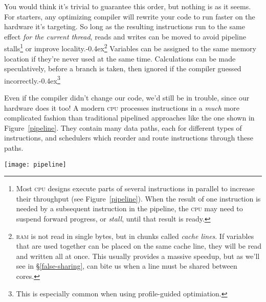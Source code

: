 \documentclass[fontsize=\bodyfontsize, numbers=endperiod]{scrartcl}
\newcommand{\punckern}{\kern-0.4ex}
\newcommand{\cpp}[1]{C\kern-0.1ex\raisebox{0.15ex}{\texttt{++}}{\addfontfeature{Numbers=LowercaseOff}#1}}
\newcommand{\fig}[1]{Figure~\ref{#1}}
\newcommand{\introduce}[1]{\textit{#1}}
\newcommand{\secref}[1]{\hyperref[#1]{\textsc{\S}\ref*{#1}}}
\newenvironment{colfigure}
  {\par\vspace{1\baselineskip minus 0.5\baselineskip}\noindent\minipage{\linewidth}}
  {\endminipage\vspace{1\baselineskip minus 0.7\baselineskip}}
\begin{document}
\begin{multicols}{2}
You would think it's trivial to guarantee this order,
but nothing is as it seems.
For starters, any optimizing compiler will
rewrite your code to run faster on the hardware
it's targeting.
So long as the resulting instructions run to the same effect
\emph{for the current thread},
reads and writes can be moved to avoid pipeline stalls\footnote{%
Most \textsc{cpu} designs execute parts of several instructions in parallel
to increase their throughput (see \fig{pipeline}).
When the result of one instruction is needed by
a subsequent instruction in the pipeline, the \textsc{cpu} may need
to suspend forward progress, or \introduce{stall}, until that result is ready.}
or improve locality.\punckern\footnote{%
\textsc{ram} is not read in single bytes, but in chunks called
\introduce{cache lines}.
If variables that are used together can be placed on the same cache line,
they will be read and written all at once.
This usually provides a massive speedup,
but as we'll see in \secref{false-sharing},
can bite us when a line must be shared between cores.
}
Variables can be assigned to the same memory location if they're never used
at the same time.
Calculations can be made speculatively, before a branch is taken,
then ignored if the compiler guessed incorrectly.\punckern\footnote{This is
especially common when using profile-guided optimiation.}

Even if the compiler didn't change our code,
we'd still be in trouble, since our hardware does it too!
A modern \textsc{cpu} processes instructions in
a \emph{much} more complicated fashion than traditional pipelined approaches
like the one shown in \fig{pipeline}.
They contain many data paths, each for different types of instructions,
and schedulers which reorder and route instructions through these paths.
\begin{colfigure}
\centering
\texttt{[image: pipeline]}
\label{pipeline}
\end{colfigure}


\end{multicols}
\end{document}
